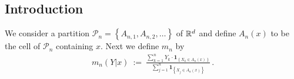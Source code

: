 \subsection*{Introduction}
%
%
We consider a partition
$
  \mathcal{P}_n
  =
  \left\{ 
    A_{n,1}
    ,
    A_{n,2}
    ,
    \ldots
  \right\}
$
of $ \mathbb{R}^d $
and define
$ A_n(x) $ to be the cell of $ \mathcal{P}_n $ containing $x$.
Next we define $ m_n $ by
\begin{gather}
  m_n(Y|x)
  \ 
  :=
  \ 
  \frac
  {
    \sum_{k=1}^{n} 
    Y_k
    \cdot
    \mathbf{1}
    _
    {
      \left\{ 
      X_k \in A_n(x)
      \right\}
    }
  }
  {
    \sum_{j=1}^{n} 
    \mathbf{1}
    _
    {
      \left\{ 
      X_j \in A_n(x)
      \right\}
    }
  }
  \,.
\end{gather}
